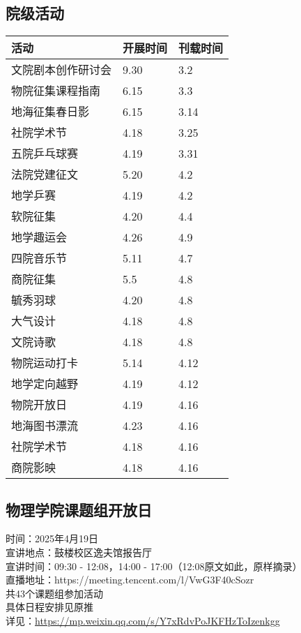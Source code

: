 \documentclass[letterpaper, 12pt]{article}
\begin{document}
\begin{multicols}{2}
\section{院级活动}
\begin{tabular}{|>{\centering\arraybackslash}m{}|m{}|m{}|}
\hline
    活动 & 开展时间 & 刊载时间\\
    \hline\hline
    文院剧本创作研讨会 & 9.30 & 3.2\\
    物院征集课程指南 & 6.15 & 3.3\\
    地海征集春日影 & 6.15 & 3.14\\
    社院学术节 & 4.18 & 3.25\\
    五院乒乓球赛 & 4.19 & 3.31\\
    法院党建征文 & 5.20 & 4.2\\
    地学乒赛 & 4.19 & 4.2\\
    软院征集 & 4.20 & 4.4\\
    地学趣运会 & 4.26 & 4.9\\
    四院音乐节 & 5.11 & 4.7\\
    商院征集 & 5.5 & 4.8\\
    毓秀羽球 & 4.20 & 4.8\\
    大气设计 & 4.18 & 4.8\\
    文院诗歌 & 4.18 & 4.8\\
    物院运动打卡 & 5.14 & 4.12\\
    地学定向越野 & 4.19 & 4.12\\
    物院开放日 & 4.19 & 4.16\\
    地海图书漂流 & 4.23 & 4.16\\
    社院学术节 & 4.18 & 4.16\\
    商院影映 & 4.18 & 4.16\\
    \hline
\end{tabular}
\subsection{物理学院课题组开放日}
时间：2025年4月19日
\\宣讲地点：鼓楼校区逸夫馆报告厅
\\宣讲时间：09:30 - 12:08，14:00 - 17:00（12:08原文如此，原样摘录）
\\直播地址：https://meeting.tencent.com/l/VwG3F40cSozr
\\共43个课题组参加活动
\\具体日程安排见原推
\\详见：\url{https://mp.weixin.qq.com/s/Y7xRdvPoJKFHzToIzenkgg}


\end{multicols}
\end{document}
